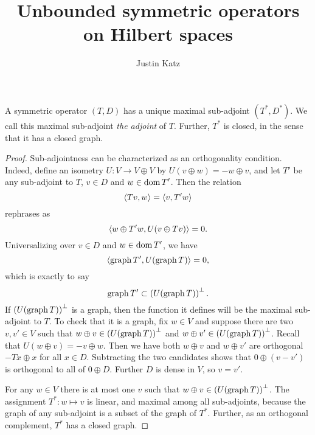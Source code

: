 \documentclass[11pt]{amsart}
\title{Unbounded symmetric operators on Hilbert spaces}
\author{Justin Katz}
\begin{document}
\maketitle
	\begin{claim}
		A symmetric operator $(T,D)$ has a unique maximal sub-adjoint $(T^*,D^*)$. We call this maximal sub-adjoint \emph{the adjoint} of $T$. Further, $T^*$ is closed, in the sense that it has a closed graph.
	\end{claim}
	\begin{proof}
		Sub-adjointness can be characterized as an orthogonality condition. Indeed, define an isometry $U:V \to V \oplus V$ by $U(v \oplus w)=-w \oplus v$, and let $T'$ be any sub-adjoint to $T$, $v\in D$ and $w\in \operatorname{dom} T'$. Then the relation
			\begin{equation*}
				\langle Tv, w \rangle=\langle v, T'w \rangle
			\end{equation*}
		rephrases as
			\begin{equation*}
				\langle w \oplus T'w, U(v \oplus Tv) \rangle=0.
			\end{equation*}
		Universalizing over $v\in D$ and $w \in \operatorname{dom} T'$, we have 
			\begin{equation*}
				\langle \operatorname{graph} T', U(\operatorname{graph} T) \rangle=0,
			\end{equation*}
		which is exactly to say
			\begin{equation*}
				\operatorname{graph} T' \subset \left(U(\operatorname{graph} T)\right)^\perp.
			\end{equation*}
		If $\left(U(\operatorname{graph} T)\right)^\perp$ is a graph, then the function it defines will be the maximal sub-adjoint to $T$. To check that it is a graph, fix $w \in V$ and suppose there are two $v,v' \in V$ such that $w \oplus v \in \left(U(\operatorname{graph} T)\right)^\perp$ and $w \oplus v' \in \left(U(\operatorname{graph} T)\right)^\perp$. Recall that $U(w \oplus v)=-v\oplus w$. Then we have both $w \oplus v$ and $w \oplus v'$ are orthogonal $-Tx \oplus x$ for all $x \in D$. Subtracting the two candidates shows that $0\oplus (v-v')$ is orthogonal to all of $0 \oplus D$. Further $D$ is dense in $V$, so $v=v'$.  
		
		For any $w\in V$ there is at most one $v$ such that $w \oplus v \in \left(U(\operatorname{graph} T)\right)^\perp$. The assignment $T^*:w \mapsto v$ is linear, and maximal among all sub-adjoints, because the graph of any sub-adjoint is a subset of the graph of $T^*$. Further, as an orthogonal complement, $T^*$ has a closed graph.
	\end{proof}
\end{document}
